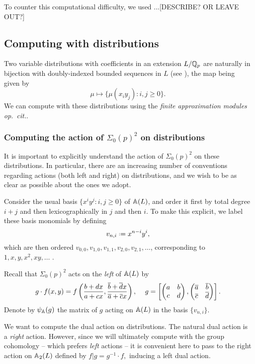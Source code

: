 \documentclass[a4paper,11pt]{article}
\numberwithin{equation}{section}
\begin{document}
To counter this computational difficulty, we used ...[DESCRIBE? OR LEAVE OUT?]



\subsection{Computing with distributions}
Two variable distributions with coefficients in an extension $L/\mathbb{Q}_p$ are naturally in bijection with doubly-indexed bounded sequences in $L$ (see \cite[Proposition 3.6]{Wil17}), the map being given by
\[
 \mu \mapsto \{\mu(x_iy_j) : i,j \geq 0\}. 
\]
We can compute with these distributions using the \emph{finite approximation modules} \emph{op.\ cit.}.

\subsubsection{Computing the action of \texorpdfstring{$\Sigma_0(p)^2$}{S0(p)2} on distributions}

It is important to explicitly understand the action of $\Sigma_0(p)^2$ on these distributions. In particular, there are an increasing number of conventions regarding actions (both left and right) on distributions, and we wish to be as clear as possible about the ones we adopt.
\begin{definition}
Consider the usual basis $\{x^iy^j : i,j \geq 0\}$ of $\mathbb{A}(L)$, and order it first by total degree $i+j$ and then lexicographically in $j$ and then $i$. To make this explicit, we label these basis monomials by defining
\[
	v_{n,i} \defeq x^{n-i}y^{i},
 \]
which are then ordered $v_{0,0}, v_{1,0},v_{1,1},v_{2,0},v_{2,1},\dots$, corresponding to $1,x,y,x^2,xy,\dots$ .
\end{definition}
Recall that $\Sigma_0(p)^2$ acts on the \emph{left} of $\mathbb{A}(L)$ by
\[
	g \cdot f(x,y) = f\left(\frac{b+dx}{a+cx},\frac{\overline{b}+\overline{d}x}{\overline{a} + \overline{c}x}\right), \hspace{12pt} g = \left[\begin{pmatrix}a & b\\c & d\end{pmatrix},\begin{pmatrix}\overline{a} & \overline{b}\\\overline{c} & \overline{d}\end{pmatrix}\right].
\]
Denote by $\psi_{\mathbb{A}}(g)$ the matrix of $g$ acting on $\mathbb{A}(L)$ in the basis $
\{v_{n,i}\}$.

We want to compute the dual action on distributions. The natural dual action is a \emph{right} action. However, since we will ultimately compute with the group cohomology -- which prefers \emph{left} actions -- it is convenient here to pass to the right action on $\mathbb{A}_2(L)$ defined by $f|g = g^{-1}\cdot f,$ inducing a left dual action. 
\end{document}
